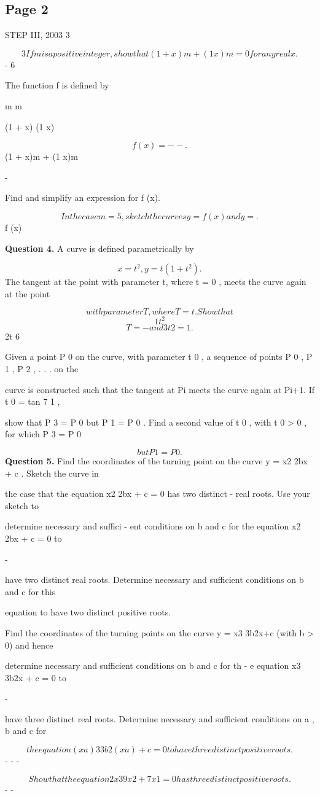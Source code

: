 \documentclass[12pt]{article}
\begin{document}
\subsection*{Page 2}
\begin{flushleft}
STEP III, 2003 3\par
\[3 If m is a positive integer, show that (1 + x) m + (1 x) m = 0 for any real x .\]
- 6\par
The function f is defined by\par
m m\par
(1 + x) (1 x)\par
\[f (x) = - - .\]
(1 + x)m + (1 x)m\par
-\par
Find and simplify an expression for f (x).\par
\[In the case m = 5 , sketch the curves y = f (x) and y = .\]
f (x)\par
\bigskip\textbf{Question 4.} A curve is defined parametrically by\par
\[x = t^2 , y = t(1 + t^2 ) .\]
The tangent at the point with parameter t, where t = 0 , meets the curve again at the point\par
\[with parameter T , where T = t . Show that\]
\[1 t^2\]
\[T = - and 3t2 = 1 .\]
2t 6\par
Given a point P 0 on the curve, with parameter t 0 , a sequence of points P 0 , P 1 , P 2 , . . . on the\par
curve is constructed such that the tangent at Pi meets the curve again at Pi+1. If t 0 = tan 7 1  ,\par
show that P 3 = P 0 but P 1 = P 0 . Find a second value of t 0 , with t 0 > 0 , for which P 3 = P 0\par
\[but P 1 = P 0 .\]
\bigskip\textbf{Question 5.} Find the coordinates of the turning point on the curve y = x2 2bx + c . Sketch the curve in\par
the case that the equation x2 2bx + c = 0 has two distinct - real roots. Use your sketch to\par
determine necessary and suffici - ent conditions on b and c for the equation x2 2bx + c = 0 to\par
-\par
have two distinct real roots. Determine necessary and sufficient conditions on b and c for this\par
equation to have two distinct positive roots.\par
Find the coordinates of the turning points on the curve y = x3 3b2x+c (with b > 0) and hence\par
determine necessary and sufficient conditions on b and c for th - e equation x3 3b2x + c = 0 to\par
-\par
have three distinct real roots. Determine necessary and sufficient conditions on a , b and c for\par
\[the equation (x a) 3 3b2 (x a) + c = 0 to have three distinct positive roots.\]
- - -\par
\[Show that the equation 2x3 9x2 + 7x 1 = 0 has three distinct positive roots.\]
- -\par
\end{flushleft}
\end{document}
